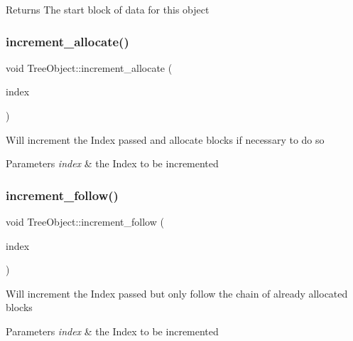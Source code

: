 \begin{DoxyReturn}{Returns}
The start block of data for this object 
\end{DoxyReturn}
\mbox{\label{classTreeObject_a6b6f0a5c23577748b489652013fa1728}} 
\subsubsection{\texorpdfstring{increment\+\_\+allocate()}{increment\_allocate()}}
{\footnotesize\ttfamily void Tree\+Object\+::increment\+\_\+allocate (\begin{DoxyParamCaption}\item[{\mbox{\hyperlink{structindex}{Index}} $\ast$}]{index }\end{DoxyParamCaption})}

Will increment the Index passed and allocate blocks if necessary to do so 
\begin{DoxyParams}{Parameters}
{\em index} & the Index to be incremented \\
\hline
\end{DoxyParams}
\mbox{\label{classTreeObject_a86fbde9e7ee245385bf7ca7a8f355bd0}} 
\subsubsection{\texorpdfstring{increment\+\_\+follow()}{increment\_follow()}}
{\footnotesize\ttfamily void Tree\+Object\+::increment\+\_\+follow (\begin{DoxyParamCaption}\item[{\mbox{\hyperlink{structindex}{Index}} $\ast$}]{index }\end{DoxyParamCaption})}

Will increment the Index passed but only follow the chain of already allocated blocks 
\begin{DoxyParams}{Parameters}
{\em index} & the Index to be incremented \\
\hline
\end{DoxyParams}
\mbox{\label{classTreeObject_af8cc57edba9f435b52ccf33cfbbb2fc6}} 
